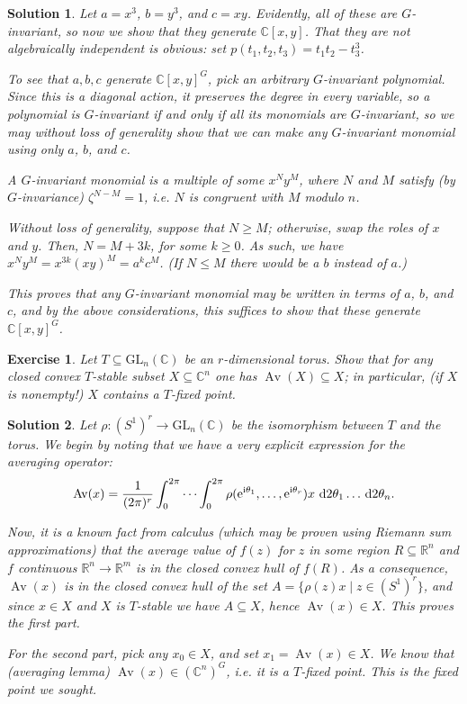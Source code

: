 \documentclass{article}
\newtheorem{ex}{Exercise}
\theoremstyle{nonumberplain}
\newtheorem{sol}{Solution}
\newcommand{\R}{\mathbb{R}}
\newcommand{\C}{\mathbb{C}}
\newcommand{\I}{\mathrm{i}}
\newcommand{\e}{\mathrm{e}}
\DeclareMathOperator{\Av}{Av}
\newcommand{\GL}{\mathrm{GL}}
\begin{document}
\begin{sol}
Let $a = x^3$, $b = y^3$, and $c = xy$. Evidently, all of these are $G$-invariant, so now we show that they generate $\C[x,y]$. That they are not algebraically independent is obvious: set $p(t_1, t_2, t_3) = t_1 t_2 - t_3^3$.

To see that $a, b, c$ generate $\C[x,y]^G$, pick an arbitrary $G$-invariant polynomial. Since this is a diagonal action, it preserves the degree in every variable, so a polynomial is $G$-invariant if and only if all its monomials are $G$-invariant, so we may without loss of generality show that we can make any $G$-invariant monomial using only $a$, $b$, and $c$.

A $G$-invariant monomial is a multiple of some $x^N y^M$, where $N$ and $M$ satisfy (by $G$-invariance) $\zeta^{N-M} = 1$, i.e. $N$ is congruent with $M$ modulo $n$.

Without loss of generality, suppose that $N \geq M$; otherwise, swap the roles of $x$ and $y$. Then, $N = M + 3k$, for some $k \geq 0$. As such, we have $x^N y^M = x^{3k} (xy)^M = a^k c^M$. (If $N \leq M$ there would be a $b$ instead of $a$.)

This proves that any $G$-invariant monomial may be written in terms of $a$, $b$, and $c$, and by the above considerations, this suffices to show that these generate $\C[x,y]^G$.
\end{sol}

\pagebreak

\begin{ex}
Let $T \subseteq \GL_n(\C)$ be an $r$-dimensional torus. Show that for any closed convex $T$-stable subset $X \subseteq \C^n$ one has $\Av(X) \subseteq X$; in particular, (if $X$ is nonempty!) $X$ contains a $T$-fixed point.
\end{ex}

\begin{sol}
Let $\rho \colon (S^1)^r \to \GL_n(\C)$ be the isomorphism between $T$ and the torus. We begin by noting that we have a very explicit expression for the averaging operator:
\begin{equation}
\Av(x) = \frac1{(2\pi)^r} \int_0^{2\pi} \cdots \int_0^{2\pi} \rho(\e^{\I \theta_1}, \dots, \e^{\I \theta_r}) x \, \dl2 \theta_1 \dots \dl2 \theta_n.
\end{equation}

Now, it is a known fact from calculus (which may be proven using Riemann sum approximations) that the average value of $f(z)$ for $z$ in some region $R \subseteq \R^n$ and $f$ continuous $\R^n \to \R^m$ is in the closed convex hull of $f(R)$. As a consequence, $\Av(x)$ is in the closed convex hull of the set $A = \{\rho(z) x \mid z \in (S^1)^r\}$, and since $x \in X$ and $X$ is $T$-stable we have $A \subseteq X$, hence $\Av(x) \in X$. This proves the first part.

For the second part, pick any $x_0 \in X$, and set $x_1 = \Av(x) \in X$. We know that (averaging lemma) $\Av(x) \in (\C^n)^G$, i.e. it is a $T$-fixed point. This is the fixed point we sought.
\end{sol}
\end{document}
